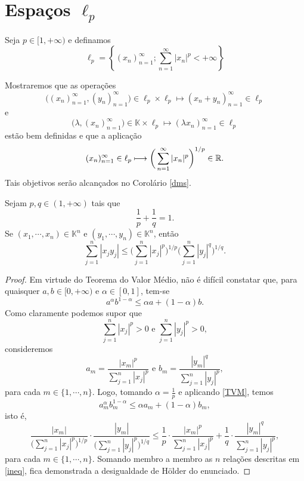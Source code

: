 
\section{Espaços $\ell_p$}

\begin{example}\label{lp}
    Seja $p\in [1,+\infty )$ e definamos 
    \[
    \displaystyle \ell_p =\left\{ (x_n )_{n=1}^{\infty}; \sum_{n=1}^{\infty} |x_n|^p <+\infty \right\}
    \]
    
    Mostraremos que as operações 
    \[
    \bigg( (x_n )_{n=1}^{\infty},(y_n )_{n=1}^{\infty} \bigg) \in \ell_p \times \ell_p \longmapsto (x_n +y_n )_{n=1}^{\infty} \in \ell_p
    \]
    e
    \[
    \bigg( \lambda ,(x_n )_{n=1}^{\infty} \bigg) \in \mathbb K \times \ell_p \longmapsto (\lambda x_n )_{n=1}^{\infty} \in \ell_p
    \]
    estão bem definidas e que a aplicação 
    \[
    \displaystyle (x_n )_{n=1}^{\infty} \in \ell_p \longmapsto \bigg( \sum_{n=1}^{\infty} |x_n|^p \bigg)^{1/p} \in \mathbb{R} .
    \]
    Tais objetivos serão alcançados no Corolário \ref{dms}.
\end{example}

\begin{proposition} \label{dhsomas}
    Sejam $p,q \in (1,+\infty)$ tais que 
    \[
    \displaystyle \frac{1}{p} + \frac{1}{q} =1.
    \]
    Se $(x_1, \cdots , x_n) \in \mathbb K^n$ e $(y_1, \cdots , y_n) \in \mathbb K^n$, então 
    \[
    \displaystyle \sum_{j=1}^{n} |x_j y_j|\leq \bigg( \sum_{j=1}^{n} |x_j|^p \bigg)^{1/p} \bigg( \sum_{j=1}^{n} |y_j|^q \bigg)^{1/q} .
    \]
\end{proposition}
\begin{proof}
    Em virtude do Teorema do Valor Médio, não é difícil constatar que, para quaisquer $a,b\in [0,+\infty )$ e $\alpha \in [0,1]$, tem-se
    \begin{equation}\label{TVM}
    \displaystyle a^{\alpha} b^{1-\alpha} \leq \alpha a + (1-\alpha )b.
    \end{equation}
    Como claramente podemos supor que
    \[
    \sum_{j=1}^{n} |x_j|^p >0 \text{  e  } \sum_{j=1}^{n} |y_j|^p >0,
    \]
    consideremos 
    \[
    \displaystyle a_{m} = \frac{|x_{m}|^p}{\sum_{j=1}^{n} |x_j|^p} \text{  e  } b_{m} = \frac{|y_{m}|^q}{\sum_{j=1}^{n} |y_j|^p},
    \]
    para cada $m\in \{1,\cdots , n\}$. Logo, tomando $\alpha = \frac{1}{p}$ e aplicando \eqref{TVM}, temos
    \[
    \displaystyle a_{m}^{\alpha} b_{m}^{1-\alpha} \leq \alpha a_m + (1-\alpha )b_m ,
    \]
    isto é,
    \begin{equation}\label{ineq}
    \displaystyle \frac{|x_{m}|}{\bigg(\sum_{j=1}^{n} |x_j|^p \bigg)^{1/p}} \cdot \frac{|y_{m}|}{\bigg(\sum_{j=1}^{n} |y_j|^p \bigg)^{1/q}}
    \leq \frac{1}{p} \cdot \frac{|x_{m}|^p}{\sum_{j=1}^{n} |x_j|^p}+ \frac{1}{q} \cdot \frac{|y_{m}|^q}{\sum_{j=1}^{n} |y_j|^p},
    \end{equation}
    para cada $m\in \{ 1,\cdots , n\}$. Somando membro a membro as $n$ relações descritas em \eqref{ineq}, fica demonstrada a desigualdade de Hölder do enunciado.
\end{proof}

